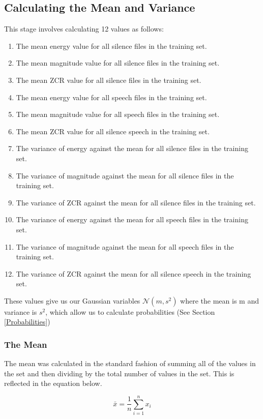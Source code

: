 \documentclass[12pt]{article} %
\begin{document}
\subsection{Calculating the Mean and Variance}
This stage involves calculating 12 values as follows:
\begin{enumerate}[i]
\item The mean energy value for all silence files in the training set.
\item The mean magnitude value for all silence files in the training set.
\item The mean ZCR value for all silence files in the training set.
\item The mean energy value for all speech files in the training set.
\item The mean magnitude value for all speech files in the training set.
\item The mean ZCR value for all silence speech in the training set.

\item The variance of energy against the mean for all silence files in the training set.
\item The variance of magnitude against the mean for all silence files in the training set.
\item The variance of ZCR against the mean for all silence files in the training set.
\item The variance of energy against the mean for all speech files in the training set.
\item The variance of magnitude against the mean for all speech files in the training set.
\item The variance of ZCR against the mean for all silence speech in the training set.
\end{enumerate}

These values give us our Gaussian variables $\mathcal{N}(m,s^2)$ where the mean is m and variance is
$s^2$, which allow us to calculate probabilities (See Section \ref{Probabilities})

\subsubsection{The Mean}
The mean was calculated in the standard fashion of summing all of the values in the set and then
dividing by the total number of values in the set. This is reflected in the equation below.

\[
\bar{x}= \frac{1}{n}\sum_{i=1}^{n}x_i
\]
\end{document}
